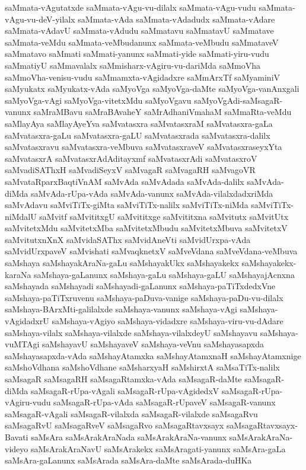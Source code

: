 {saMmata-vAgutatxde
saMmata-vAgu-vu-dilalx
saMmata-vAgu-vudu
saMmata-vAgu-vu-deV-yilalx
saMmata-vAda
saMmata-vAdadudx
saMmata-vAdare
saMmata-vAdavU
saMmata-vAdudu
saMmatavu
saMmatavU
saMmatave
saMmata-veMdu
saMmata-veMbudanunx
saMmata-veMbudu
saMmataveV
saMmatavo
saMmati
saMmati-yanunx
saMmati-yide
saMmati-yiru-vudu
saMmatiyU
saMmavalalx
saMmisharx-vAgiru-vu-dariMda
saMmoVha
saMmoVha-venisu-vudu
saMmamxta-vAgidadxre
saMmArxTf
saMyaminiV
saMyukatx
saMyukatx-vAda
saMyoVga
saMyoVga-daMte
saMyoVga-vanAnxgali
saMyoVga-vAgi
saMyoVga-vitetxMdu
saMyoVgavu
saMyoVgAdi-saMsagaR-vanunx
saMraMBavu
saMraBAvaheY
saMrAdhaniVmahaM
saMmaRta-veMdu
saMlayAya
saMlayAyeYva
saMvatasxra
saMvatasxraM
saMvatasxra-gaLa
saMvatasxra-gaLu
saMvatasxra-gaLU
saMvatasxrada
saMvatasxra-dalilx
saMvatasxravu
saMvatasxra-veMbuva
saMvatasxraveV
saMvatasxraseyxYta
saMvatasxrA
saMvatasxrAdAditayxmf
saMvatasxrAdi
saMvatasxroV
saMvadiSAThxH
saMvadiSeyxV
saMvagaR
saMvagaRH
saMvagoVR
saMvataRparxBaqtiVnAM
saMvAda
saMvAdada
saMvAda-dalilx
saMvAda-diMda
saMvAda-rUpa-vAda
saMvAda-vanunx
saMvAda-vilalxdadxriMda
saMvAdavu
saMviTiTx-giMta
saMviTiTx-nalilx
saMviTiTx-niMda
saMviTiTx-niMdalU
saMvitf
saMvititxgU
saMvititxge
saMvititxna
saMvitutx
saMvitUtx
saMvitetxMdu
saMvitetxMba
saMvitetxMbudu
saMvitetxMbuva
saMvitetxV
saMvitutxnXnX
saMvidaSAThx
saMvidAneVti
saMvidUrxpa-vAda
saMvidUrxpaveV
saMvishati
saMvaqknetxV
saMveVdana
saMveVdana-veMbuva
saMshaya
saMshayakAraNa-gaLu
saMshayakUkx
saMshayakekx
saMshayakekx-karaNa
saMshaya-gaLanunx
saMshaya-gaLu
saMshaya-gaLU
saMshayajAcnxna
saMshayada
saMshayadi
saMshayadi-gaLanunx
saMshaya-paTiTxdedxVne
saMshaya-paTiTxruvenu
saMshaya-paDuva-vanige
saMshaya-paDu-vu-dilalx
saMshaya-BArxMti-galilalxde
saMshaya-vanunx
saMshaya-vAgi
saMshaya-vAgidadxrU
saMshaya-vAgiyo
saMshaya-vidadxre
saMshaya-viru-vu-dAdare
saMshaya-vilalx
saMshaya-vilalxde
saMshaya-vilalxdeyU
saMshayavu
saMshaya-vuMTAgi
saMshayavU
saMshayaveV
saMshaya-veVnu
saMshayasapxda
saMshayasapxda-vAda
saMshayAtamxka
saMshayAtamxnaH
saMshayAtamxnige
saMshoVdhana
saMshoVdhane
saMsharxyaH
saMshirxtA
saMsaTiTx-nalilx
saMsagaR
saMsagaRH
saMsagaRtamxka-vAda
saMsagaR-daMte
saMsagaR-diMda
saMsagaR-rUpa-vAgali
saMsagaR-rUpa-vAgidedxV
saMsagaR-rUpa-vAgiru-vudu
saMsagaR-rUpa-vAda
saMsagaR-rUpaveV
saMsagaR-vanunx
saMsagaR-vAgali
saMsagaR-vilalxda
saMsagaR-vilalxde
saMsagaRvu
saMsagaRvU
saMsagaRveV
saMsagaRvo
saMsagaRtavxsayx
saMsagaRtavxsayx-Bavati
saMsAra
saMsArakAraNada
saMsArakAraNa-vanunx
saMsArakAraNa-videyo
saMsArakAraNavU
saMsArakekx
saMsAragati-yanunx
saMsAra-gaLa
saMsAra-gaLanunx
saMsArada
saMsAra-daMte
saMsArada-duHKa
}
